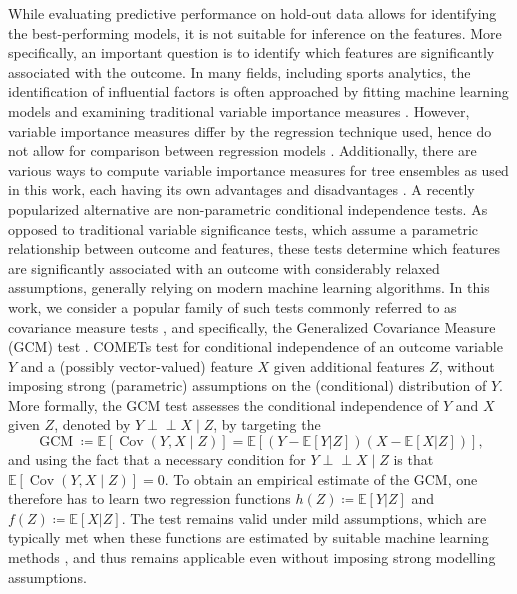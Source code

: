\documentclass[namedate,webpdf,modern,medium]{oup-authoring-template}
\begin{document}
While evaluating predictive performance on hold-out data allows for identifying the best-performing models, it is not suitable for inference on the features. More specifically, an important question is to identify which features are significantly associated with the outcome. %
In many fields, including sports analytics, the identification of influential factors is often approached by fitting machine learning models and examining traditional variable importance measures \citep{bajons2025mlsi}. However, variable importance measures differ by the regression technique used, hence do not allow for comparison between regression models \citep{williamson20varimp}. Additionally, there are various ways to compute variable importance measures for tree ensembles as used in this work, each having its own advantages and disadvantages \citep{Strobl08varimp}. A recently popularized alternative are non-parametric conditional independence tests. As opposed to traditional variable significance tests, which assume a parametric relationship between outcome and features, these tests determine which features are significantly associated with an outcome with considerably relaxed assumptions, generally relying on modern machine learning algorithms. In this work, we consider a popular family of such tests commonly referred to as covariance measure tests \citep[COMETs, see, e.g.,][]{kook24comets}, and specifically, the Generalized Covariance Measure (GCM) test \citep{Shah20gcm}. COMETs test for conditional independence of an outcome variable $Y$ and a (possibly vector-valued) feature $X$ given additional features $Z$, without imposing strong (parametric) assumptions on the (conditional) distribution of $Y$.
More formally, the GCM test assesses the conditional independence of $Y$ and $X$ given $Z$, denoted by $Y \perp\!\!\!\perp X \mid Z$, by targeting the 
\begin{equation}\label{eq:GCM}
\operatorname{GCM} \coloneqq \mathbb{E}[\operatorname{Cov}(Y,X \mid Z)] =\mathbb{E}[(Y -
\mathbb{E}[Y | Z])(X - \mathbb{E}[X | Z])],
\end{equation}
and using the fact that a necessary condition for $Y \perp\!\!\!\perp X \mid Z$ is that $\mathbb{E}[\operatorname{Cov}(Y,X \mid Z)] = 0$. To obtain an empirical estimate of the GCM, one therefore has to learn two regression functions $h(Z) \coloneqq \mathbb{E}[Y | Z]$ and $f(Z) \coloneqq \mathbb{E}[X | Z]$. The test remains valid under mild assumptions, which are typically met when these functions are estimated by suitable machine learning methods \citep{Shah20gcm}, and thus remains applicable even without imposing strong modelling assumptions.
\end{document}
